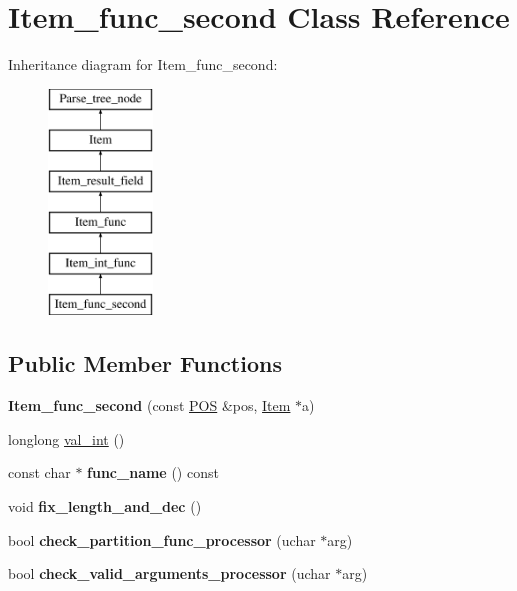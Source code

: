 \hypertarget{classItem__func__second}{}\section{Item\+\_\+func\+\_\+second Class Reference}
\label{classItem__func__second}
Inheritance diagram for Item\+\_\+func\+\_\+second\+:\begin{figure}[H]
\begin{center}
\leavevmode
\includegraphics[height=6.000000cm]{classItem__func__second}
\end{center}
\end{figure}
\subsection*{Public Member Functions}
\begin{DoxyCompactItemize}
\item 
\mbox{\label{classItem__func__second_aa6f48d5819b504b424c9fec108297bf2}} 
{\bfseries Item\+\_\+func\+\_\+second} (const \mbox{\hyperlink{structYYLTYPE}{P\+OS}} \&pos, \mbox{\hyperlink{classItem}{Item}} $\ast$a)
\item 
longlong \mbox{\hyperlink{classItem__func__second_a3d9ce952332cc1d18fa9528083ae650a}{val\+\_\+int}} ()
\item 
\mbox{\label{classItem__func__second_ace1deaf21f2ed389de68647d4cb60e77}} 
const char $\ast$ {\bfseries func\+\_\+name} () const
\item 
\mbox{\label{classItem__func__second_a623a285263e24b147fa662e661c67b29}} 
void {\bfseries fix\+\_\+length\+\_\+and\+\_\+dec} ()
\item 
\mbox{\label{classItem__func__second_aae3703b2c9168a15a7c00b1c76b14e70}} 
bool {\bfseries check\+\_\+partition\+\_\+func\+\_\+processor} (uchar $\ast$arg)
\item 
\mbox{\label{classItem__func__second_ad51f07c25f44d2eafebf4863df18b4f1}} 
bool {\bfseries check\+\_\+valid\+\_\+arguments\+\_\+processor} (uchar $\ast$arg)
\end{DoxyCompactItemize}
